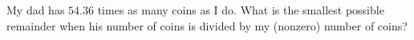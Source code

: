 My dad has $54.36$ times as many coins as I do. What is the smallest possible remainder when his number of coins is divided by my (nonzero) number of coins?
